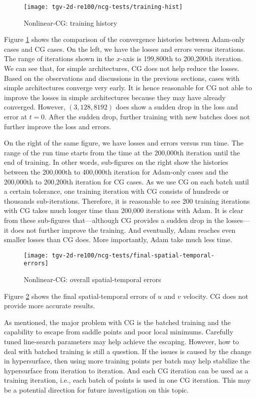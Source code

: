 \begin{figure}[hbt!]
    \centering%
    \texttt{[image: tgv-2d-re100/ncg-tests/training-hist]}%
    \caption[%
        Nonlinear-CG: training history%
    ]{%
        Nonlinear-CG: training history%
    }\label{fig:ncg-tests-train-hist}%
\end{figure}

Figure \ref{fig:ncg-tests-train-hist} shows the comparison of the convergence histories between Adam-only cases and CG cases.
On the left, we have the losses and errors versus iterations.
The range of iterations shown in the $x$-axis is 199,800th to 200,200th iteration.
We can see that, for simple architectures, CG does not help reduce the losses.
Based on the observations and discussions in the previous sections, cases with simple architectures converge very early.
It is hence reasonable for CG not able to improve the losses in simple architectures because they may have already converged.
However, $(3, 128, 8192)$ does show a sudden drop in the loss and error at $t=0$.
After the sudden drop, further training with new batches does not further improve the loss and errors.

On the right of the same figure, we have losses and errors versus run time.
The range of the run time starts from the time at the 200,000th iteration until the end of training.
In other words, sub-figures on the right show the histories between the 200,000th to 400,000th iteration for Adam-only cases and the 200,000th to 200,200th iteration for CG cases.
As we use CG on each batch until a certain tolerance, one training iteration with CG consists of hundreds or thousands sub-iterations.
Therefore, it is reasonable to see 200 training iterations with CG takes much longer time than 200,000 iterations with Adam.
It is clear from these sub-figures that---although CG provides a sudden drop in the losses---it does not further improve the training.
And eventually, Adam reaches even smaller losses than CG does.
More importantly, Adam take much less time.

\begin{figure}[hbt!]
    \centering%
    \texttt{[image: tgv-2d-re100/ncg-tests/final-spatial-temporal-errors]}%
    \caption[%
        Nonlinear-CG: overall spatial-temporal errors%
    ]{%
        Nonlinear-CG: overall spatial-temporal errors%
    }\label{fig:ncg-tests-final-sterrs}%
\end{figure}

Figure \ref{fig:ncg-tests-final-sterrs} shows the final spatial-temporal errors of $u$ and $v$ velocity.
CG does not provide more accurate results.

As mentioned, the major problem with CG is the batched training and the capability to escape from saddle points and poor local minimums.
Carefully tuned line-search parameters may help achieve the escaping.
However, how to deal with batched training is still a question.
If the issues is caused by the change in hypersurface, then using more training points per batch may help stabilize the hypersurface from iteration to iteration.
And each CG iteration can be used as a training iteration, i.e., each batch of points is used in one CG iteration.
This may be a potential direction for future investigation on this topic.

